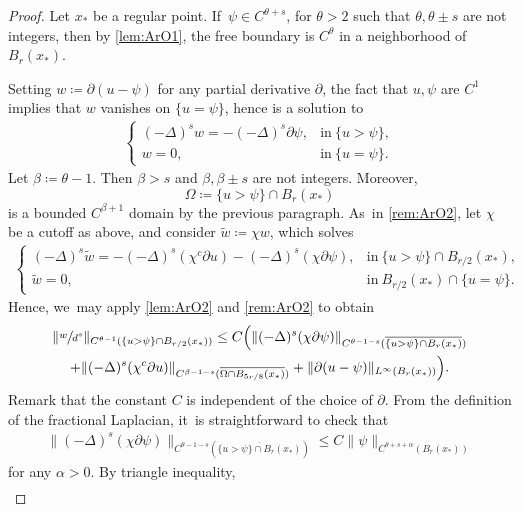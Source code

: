 \documentclass[JEP,XML,SOM,Unicode,published]{cedram}
\theoremstyle{plain}
\theoremstyle{definition}
\let\be\beta
\let\p\partial
\let\ol\overline
\let\tl\tilde
\begin{document}
\begin{proof}

Let $x_*$ be a regular point. If~$\psi \in C^{\theta+s}$, for $\theta>2$ such that $\theta,\theta\pm s$ are not integers, then by \cref{lem:ArO1}, the free boundary is $C^\theta$ in a neighborhood of $B_r(x_*)$.

Setting $w\coloneqq \p(u-\psi)$ for any partial derivative $\p$, the fact that $u,\psi$ are $C^1$ implies that $w$ vanishes on $\{u=\psi\}$, hence is a solution to
\begin{align*}
\begin{cases}
(-\Delta)^s w= {-}(- \Delta)^s\p\psi, & \text{in} \ \{u>\psi\}, \\
w =0, & \text{in} \ \{u=\psi\}.
\end{cases}
\end{align*}
Let $\be \coloneqq \theta-1$. Then $\be>s$ and $\be,\be\pm s$ are not integers. Moreover,
\[
\Omega \coloneqq \{u>\psi\} \cap B_{r}(x_*)
\]
is a bounded $C^{\be + 1}$ domain by the previous paragraph. As~in \cref{rem:ArO2}, let $\chi$ be a cutoff as above, and consider $\tl{w} \coloneqq \chi w$, which solves
\begin{align*}
\begin{cases}
(-\Delta)^s\tl{w}= -(- \Delta)^s(\chi^c {\p u}) {-} (- \Delta)^s(\chi\p\psi), & \text{in} \ \{u>\psi\} \cap B_{r/2}(x_*), \\
\tl{w} =0, & \text{in} \ B_{r/2}(x_*) \cap \{u=\psi\}.
\end{cases}
\end{align*}
Hence, we~may apply \cref{lem:ArO2} and \cref{rem:ArO2} to obtain
\begin{multline}\label{eq:wdsCth}
\|\sfrac{w}{d^s}\|_{C^{\theta-1}(\{u>\psi\}\cap B_{r/2}(x_*))}\le C\Big( \|(-\Delta)^s(\chi\p\psi)\|_{C^{\theta-1-s}(\ol{\{u>\psi\}\cap B_{r}(x_*)})}\\
+ \|(-\Delta)^s(\chi^c\p { u})\|_{C^{\be-1-s}(\ol{\Omega\cap B_{5r/8}(x_*)})}+ \|\p(u-\psi)\|_{L^\infty(B_{r}(x_*))}\Big).
\end{multline}
Remark that the constant $C$ is independent of the choice of $\p$. From the definition of the fractional Laplacian, it~is straightforward to check that
\begin{align*}
\|(-\Delta)^s(\chi\p\psi)\|_{C^{\theta-1-s}(\ol{\{u>\psi\}\cap B_{r}(x_*)})} \le C \|\psi\|_{C^{\theta+s+\alpha}(B_{r}(x_*))}
\end{align*}
for any $\alpha>0$. By triangle inequality,
\begin{align*}

\end{align*}
\end{proof}
\end{document}
